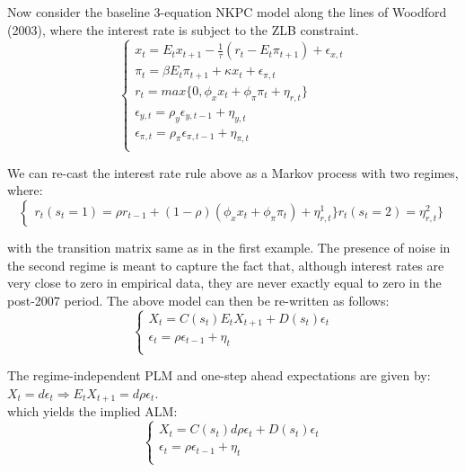 \documentclass[12pt,reqno]{article}
\numberwithin{equation}{section}
\begin{document}
Now consider the baseline 3-equation NKPC model along the lines of Woodford (2003), where the interest rate is subject to the ZLB constraint. 
$$
\begin{cases} 
x_t = E_t x_{t+1}  -\frac{1}{\tau}(r_t - E_t \pi_{t+1})+ \epsilon_{x,t} \\
\pi_t = \beta E_t \pi_{t+1} + \kappa x_t + \epsilon_{\pi,t} \\
r_t = max\{ 0, \phi_x x_t + \phi_{\pi} \pi_t + \eta_{r,t}\} \\
\epsilon_{y,t} = \rho_y \epsilon_{y,t-1} + \eta_{y,t} \\ 
\epsilon_{\pi,t} = \rho_{\pi} \epsilon_{\pi,t-1} + \eta_{\pi,t} \\
\end{cases} 
$$

We can re-cast the interest rate rule above as a Markov process with two regimes, where: \\

$$
\begin{cases}
r_t (s_t=1) = \rho r_{t-1} +(1-\rho) (\phi_x x_t + \phi_{\pi} \pi_t) + \eta^{1}_{r,t}\} 
r_t (s_t=2) =\eta^{2}_{r,t}\} 
\end{cases}
$$

with the transition matrix same as in the first example. The presence of noise in the second regime is meant to capture the fact that, although interest rates are very close to zero in empirical data, they are never exactly equal to zero in the post-2007 period. The above model can then be re-written as follows: \\

$$
\begin{cases}
X_t = C(s_t) E_t X_{t+1} + D(s_t) \epsilon_t \\
\epsilon_t = \rho \epsilon_{t-1} + \eta_t \\
\end{cases}
$$

The regime-independent PLM and one-step ahead expectations are given by: \\

 $ X_t = d \epsilon_t \Rightarrow E_t X_{t+1} = d \rho \epsilon_t $.\\

which yields the implied ALM:\\

$$
\begin{cases}
X_t = C(s_t) d \rho \epsilon_t+ D(s_t) \epsilon_t \\
\epsilon_t = \rho \epsilon_{t-1} + \eta_t \\
\end{cases}
$$
\end{document}
